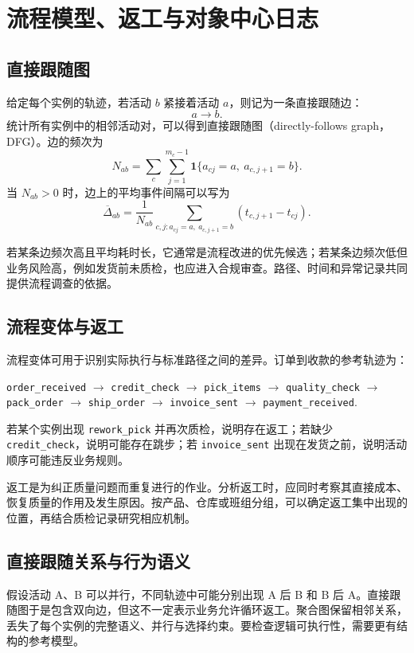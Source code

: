 \section{流程模型、返工与对象中心日志}
\subsection{直接跟随图}

给定每个实例的轨迹，若活动 \(b\) 紧接着活动 \(a\)，则记为一条直接跟随边：
\[
  a \rightarrow b.
\]
统计所有实例中的相邻活动对，可以得到直接跟随图（directly-follows graph，DFG）。边的频次为
\[
  N_{ab}
  =
  \sum_c\sum_{j=1}^{m_c-1}
  \mathbf 1\{a_{cj}=a,\ a_{c,j+1}=b\}.
\]
当 \(N_{ab}>0\) 时，边上的平均事件间隔可以写为
\[
  \overline{\Delta}_{ab}
  =
  \frac{1}{N_{ab}}
  \sum_{c,j:a_{cj}=a,\ a_{c,j+1}=b}
  (t_{c,j+1}-t_{cj}).
\]

若某条边频次高且平均耗时长，它通常是流程改进的优先候选；若某条边频次低但业务风险高，例如发货前未质检，也应进入合规审查。路径、时间和异常记录共同提供流程调查的依据。

\subsection{流程变体与返工}

流程变体可用于识别实际执行与标准路径之间的差异。订单到收款的参考轨迹为：
\begin{center}
\texttt{order\_received} \(\rightarrow\)
\texttt{credit\_check} \(\rightarrow\)
\texttt{pick\_items} \(\rightarrow\)
\texttt{quality\_check} \(\rightarrow\)
\texttt{pack\_order} \(\rightarrow\)
\texttt{ship\_order} \(\rightarrow\)
\texttt{invoice\_sent} \(\rightarrow\)
\texttt{payment\_received}.
\end{center}
若某个实例出现 \texttt{rework\_pick} 并再次质检，说明存在返工；若缺少 \texttt{credit\_check}，说明可能存在跳步；若 \texttt{invoice\_sent} 出现在发货之前，说明活动顺序可能违反业务规则。

返工是为纠正质量问题而重复进行的作业。分析返工时，应同时考察其直接成本、恢复质量的作用及发生原因。按产品、仓库或班组分组，可以确定返工集中出现的位置，再结合质检记录研究相应机制。

\subsection{直接跟随关系与行为语义}
假设活动 A、B 可以并行，不同轨迹中可能分别出现 A 后 B 和 B 后 A。直接跟随图于是包含双向边，但这不一定表示业务允许循环返工。聚合图保留相邻关系，丢失了每个实例的完整语义、并行与选择约束。要检查逻辑可执行性，需要更有结构的参考模型。

